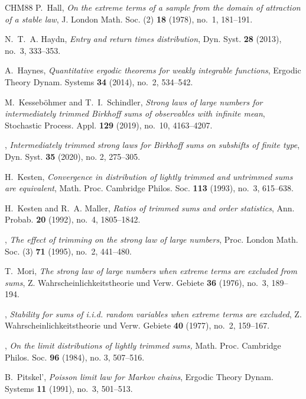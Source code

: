 \documentclass[11pt,twoside,a4paper,reqno]{amsart}
\begin{document}
\begin{thebibliography}{CHM88}
P.~Hall, \emph{On the extreme terms of a sample from the domain of attraction
  of a stable law}, J. London Math. Soc. (2) \textbf{18} (1978), no.~1,
  181--191.

N.~T.~A. Haydn, \emph{Entry and return times distribution}, Dyn. Syst.
  \textbf{28} (2013), no.~3, 333--353.

A.~Haynes, \emph{Quantitative ergodic theorems for weakly integrable functions}, Ergodic Theory Dynam. Systems
  \textbf{34} (2014), no.~2, 534--542.




M.~Kesseb\"ohmer and T.~I.~Schindler, \emph{Strong laws of large numbers for
  intermediately trimmed {B}irkhoff sums of observables with infinite mean},
  Stochastic Process. Appl. \textbf{129} (2019), no.~10, 4163--4207.


\bysame,  \emph{Intermediately trimmed strong laws for Birkhoff sums on subshifts of finite type}, Dyn. Syst. \textbf{35} (2020), no. 2, 275--305.


H.~Kesten, \emph{Convergence in distribution of lightly trimmed and untrimmed
  sums are equivalent}, Math. Proc. Cambridge Philos. Soc. \textbf{113} (1993),
  no.~3, 615--638.


H.~Kesten and R.~A. Maller, \emph{Ratios of trimmed sums and order statistics},
  Ann. Probab. \textbf{20} (1992), no.~4, 1805--1842.

\bysame, \emph{The effect of trimming on the strong law of large numbers},
  Proc. London Math. Soc. (3) \textbf{71} (1995), no.~2, 441--480.



T.~Mori, \emph{The strong law of large numbers when extreme terms are excluded
  from sums}, Z. Wahrscheinlichkeitstheorie und Verw. Gebiete \textbf{36}
  (1976), no.~3, 189--194.

\bysame, \emph{Stability for sums of i.i.d. random variables when extreme terms
  are excluded}, Z. Wahrscheinlichkeitstheorie und Verw. Gebiete \textbf{40}
  (1977), no.~2, 159--167.

 \bysame, \emph{On the limit distributions of lightly trimmed sums,} Math. Proc. Cambridge Philos. Soc. \textbf{96} (1984), no. 3, 507--516.

B.~Pitskel', \emph{Poisson limit law for Markov chains}, Ergodic Theory
  Dynam. Systems \textbf{11} (1991), no.~3, 501--513.


\end{thebibliography}
\end{document}
